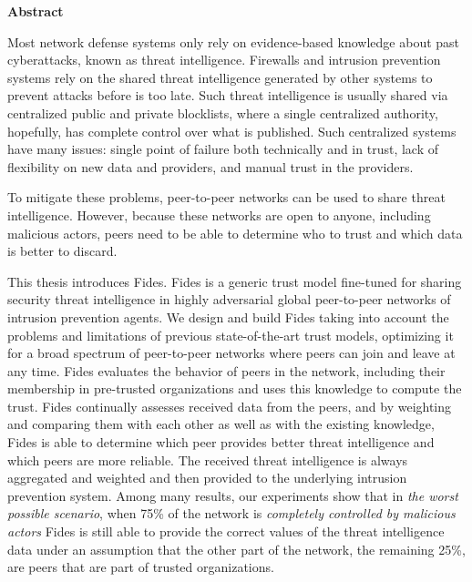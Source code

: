 \newenvironment{abstractpage}
  {\cleardoublepage\thispagestyle{empty}}
  {\vfill\cleardoublepage}
\newenvironment{abstract}[1]
  {\bigskip
   \begin{center}\bfseries#1\end{center}\small\leftskip=0.5cm\rightskip=0.5cm}
  {\par\bigskip}

\providecommand{\keywords}[2]{\footnotesize\textbf{\textit{#1:}} #2}

\begin{abstractpage}
\begin{abstract}{Abstract}

Most network defense systems only rely on evidence-based knowledge about past cyberattacks, known as threat intelligence. Firewalls and intrusion prevention systems rely on the shared threat intelligence generated by other systems to prevent attacks before is too late.
Such threat intelligence is usually shared via centralized public and private blocklists, where a single centralized authority, hopefully, has complete control over what is published. Such centralized systems have many issues: single point of failure both technically and in trust, lack of flexibility on new data and providers, and manual trust in the providers.

To mitigate these problems, peer-to-peer networks can be used to share threat intelligence. However, because these networks are open to anyone, including malicious actors, peers need to be able to determine who to trust and which data is better to discard.

This thesis introduces Fides. Fides is a generic trust model fine-tuned for sharing security threat intelligence in highly adversarial global peer-to-peer networks of intrusion prevention agents.
We design and build Fides taking into account the problems and limitations of previous state-of-the-art trust models, optimizing it for a broad spectrum of peer-to-peer networks where peers can join and leave at any time.
Fides evaluates the behavior of peers in the network, including their membership in pre-trusted organizations and uses this knowledge to compute the trust.
Fides continually assesses received data from the peers, and by weighting and comparing them with each other as well as with the existing knowledge, Fides is able to determine which peer provides better threat intelligence and which peers are more reliable. The received threat intelligence is always aggregated and weighted and then provided to the underlying intrusion prevention system.
Among many results, our experiments show that in \textit{the worst possible scenario}, when 75\% of the network is \textit{completely controlled by malicious actors} Fides is still able to provide the correct values of the threat intelligence data under an assumption that the other part of the network, the remaining 25\%, are peers that are part of trusted organizations.


\end{abstract}
\end{abstractpage}
